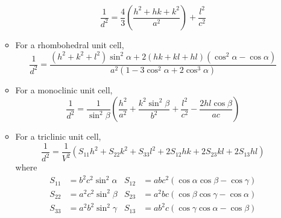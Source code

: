 \documentclass[../notes.tex]{subfiles}
\begin{document}
\begin{itemize}
\begin{itemize}
        \begin{equation*}
            \frac{1}{d^2} = \frac{4}{3}\left( \frac{h^2+hk+k^2}{a^2} \right)+\frac{l^2}{c^2}
        \end{equation*}
        \item For a rhombohedral unit cell,
        \begin{equation*}
            \frac{1}{d^2} = \frac{(h^2+k^2+l^2)\sin^2\alpha+2(hk+kl+hl)(\cos^2\alpha-\cos\alpha)}{a^2(1-3\cos^2\alpha+2\cos^3\alpha)}
        \end{equation*}
        \item For a monoclinic unit cell,
        \begin{equation*}
            \frac{1}{d^2} = \frac{1}{\sin^2\beta}\left( \frac{h^2}{a^2}+\frac{k^2\sin^2\beta}{b^2}+\frac{l^2}{c^2}-\frac{2hl\cos\beta}{ac} \right)
        \end{equation*}
        \item For a triclinic unit cell,
        \begin{equation*}
            \frac{1}{d^2} = \frac{1}{V^2}(S_{11}h^2+S_{22}k^2+S_{33}l^2+2S_{12}hk+2S_{23}kl+2S_{13}hl)
        \end{equation*}
        where
        \begin{align*}
            S_{11} &= b^2c^2\sin^2\alpha&
                S_{12} &= abc^2(\cos\alpha\cos\beta-\cos\gamma)\\
            S_{22} &= a^2c^2\sin^2\beta&
                S_{23} &= a^2bc(\cos\beta\cos\gamma-\cos\alpha)\\
            S_{33} &= a^2b^2\sin^2\gamma&
                S_{13} &= ab^2c(\cos\gamma\cos\alpha-\cos\beta)\\
        \end{align*}
    \end{itemize}
\end{itemize}
\end{document}
